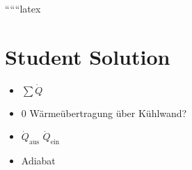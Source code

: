 ``````latex


\section*{Student Solution}

\begin{itemize}
    \item \(\sum \dot{Q}\)
    \item \(0\) Wärmeübertragung über Kühlwand?
    \item \(\dot{Q}_{\text{aus}}\) \(\dot{Q}_{\text{ein}}\)
    \item Adiabat
\end{itemize}

\[
\begin{array}{c}
\begin{array}{c}
\begin{array}{c}
\begin{array}{c}
\begin{array}{c}
\begin{array}{c}
\begin{array}{c}
\begin{array}{c}
\begin{array}{c}
\begin{array}{c}
\begin{array}{c}
\begin{array}{c}
\begin{array}{c}
\begin{array}{c}
\begin{array}{c}
\begin{array}{c}
\begin{array}{c}
\begin{array}{c}
\begin{array}{c}
\begin{array}{c}
\begin{array}{c}
\begin{array}{c}
\begin{array}{c}
\begin{array}{c}
\begin{array}{c}
\begin{array}{c}
\begin{array}{c}
\begin{array}{c}
\begin{array}{c}
\begin{array}{c}
\begin{array}{c}
\begin{array}{c}
\begin{array}{c}

\end{array}
\end{array}
\end{array}
\end{array}
\end{array}
\end{array}
\end{array}
\end{array}
\end{array}
\end{array}
\end{array}
\end{array}
\end{array}
\end{array}
\end{array}
\end{array}
\end{array}
\end{array}
\end{array}
\end{array}
\end{array}
\end{array}
\end{array}
\end{array}
\end{array}
\end{array}
\end{array}
\end{array}
\end{array}
\end{array}
\end{array}
\end{array}
\end{array}\]
